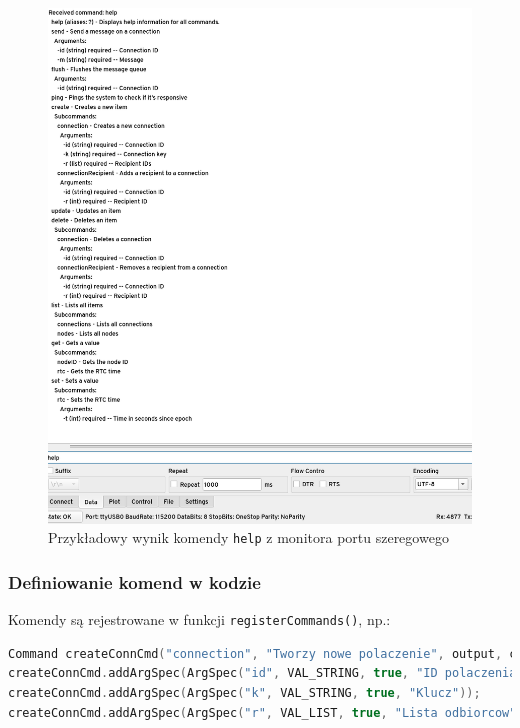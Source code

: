 \clearpage
\begin{figure}[htbp]
	\centering
	\includegraphics[width=1\textwidth]{root/help_cmd.png}
	\caption{Przykładowy wynik komendy \texttt{help} z monitora portu szeregowego}
\end{figure}

\clearpage
\subsubsection{Definiowanie komend w kodzie}

Komendy są rejestrowane w funkcji \texttt{registerCommands()}, np.:

\begin{lstlisting}[language=C++]
Command createConnCmd("connection", "Tworzy nowe polaczenie", output, createConnCallback);
createConnCmd.addArgSpec(ArgSpec("id", VAL_STRING, true, "ID polaczenia"));
createConnCmd.addArgSpec(ArgSpec("k", VAL_STRING, true, "Klucz"));
createConnCmd.addArgSpec(ArgSpec("r", VAL_LIST, true, "Lista odbiorcow"));
\end{lstlisting}

